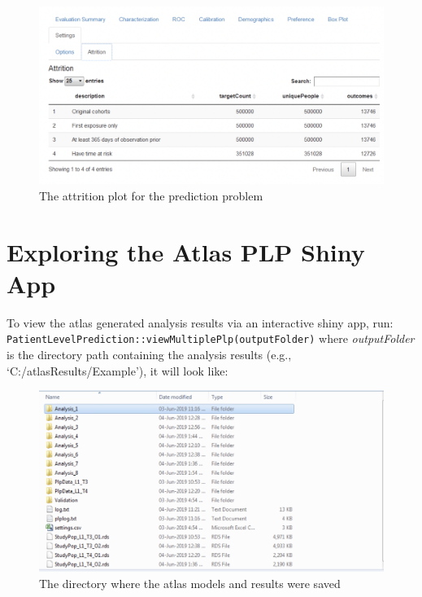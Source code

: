 \documentclass[11pt]{book}
\theoremstyle{definition}
\theoremstyle{definition}
\theoremstyle{definition}
\theoremstyle{remark}
\begin{document}
\begin{figure}

{\centering \includegraphics[width=0.8\linewidth]{images/PatientLevelPrediction/shiny/singleShiny/singleShinyAtt} 

}

\caption{The attrition plot for the prediction problem}\label{fig:shinyAtt}
\end{figure}

\hypertarget{exploring-the-atlas-plp-shiny-app}{%
\section{Exploring the Atlas PLP Shiny App}\label{exploring-the-atlas-plp-shiny-app}}

To view the atlas generated analysis results via an interactive shiny app, run:
\texttt{PatientLevelPrediction::viewMultiplePlp(outputFolder)} where \emph{outputFolder} is the directory path containing the analysis results (e.g., `C:/atlasResults/Example'), it will look like:

\begin{figure}

{\centering \includegraphics[width=0.8\linewidth]{images/PatientLevelPrediction/shiny/shinyResults} 

}

\caption{The directory where the atlas models and results were saved}\label{fig:shinyResults}
\end{figure}
\end{document}
